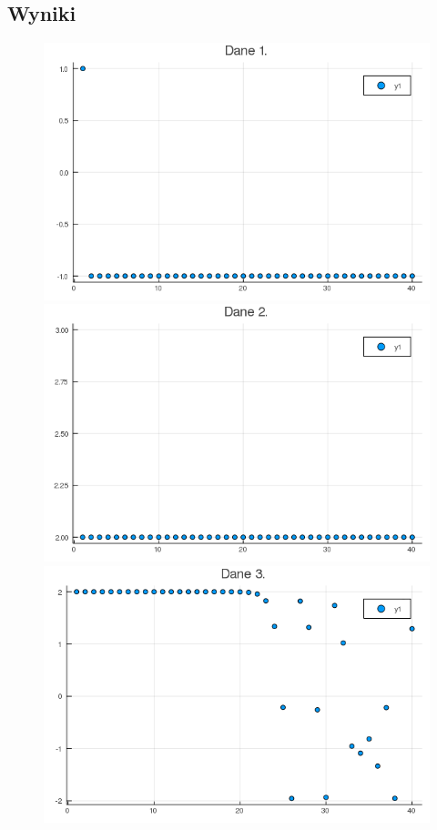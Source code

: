\documentclass{article}
\begin{document}
\subsection{Wyniki}
\begin{figure}[h]
  \begin{minipage}{0.40\textwidth}
    \centering
    \includegraphics[width=\linewidth]{plot1}
  \end{minipage}
  \begin{minipage}{0.40\textwidth}
    \centering
    \includegraphics[width=\linewidth]{plot2}
  \end{minipage}
  \begin{minipage}{0.40\textwidth}
    \centering
    \includegraphics[width=\linewidth]{plot3}

\end{minipage}
\end{figure}
\end{document}
